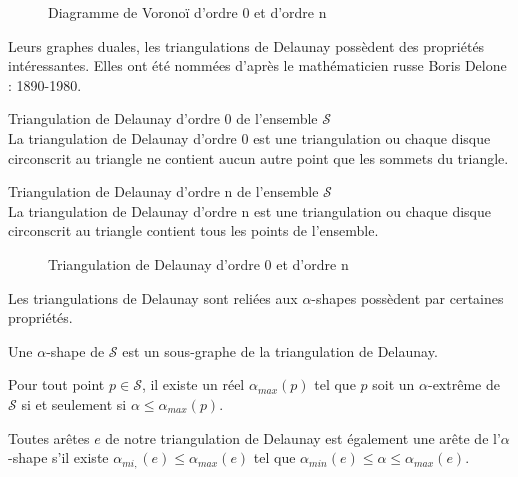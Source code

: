 \begin{figure}[H]
  \centering
  \caption{Diagramme de Voronoï d'ordre 0 et d'ordre n}
\end{figure}

Leurs graphes duales, les triangulations de Delaunay possèdent des propriétés intéressantes.  Elles ont été nommées d'après le mathématicien russe Boris Delone : 1890-1980.

\begin{Definition}{Triangulation de Delaunay d'ordre 0 de l'ensemble $\mathcal{S}$}\\
\label{def:tri-del-0}
  La triangulation de Delaunay d'ordre 0 est une triangulation ou chaque disque circonscrit au triangle ne contient aucun autre point que les sommets du triangle.
\end{Definition}

\begin{Definition}{Triangulation de Delaunay d'ordre n de l'ensemble $\mathcal{S}$}\\
\label{def:tri-del-n}
  La triangulation de Delaunay d'ordre n est une triangulation ou chaque disque circonscrit au triangle contient tous les points de l'ensemble.
\end{Definition}

\begin{figure}[H]
  \centering
  \caption{Triangulation de Delaunay d'ordre 0 et d'ordre n}
\end{figure}


Les triangulations de Delaunay sont reliées aux $\alpha$-shapes possèdent par certaines propriétés. \cite{EdeKirSei83}

\begin{Lemma}
  Une $\alpha$-shape de $\mathcal{S}$ est un sous-graphe de la triangulation de Delaunay.
\end{Lemma}

\begin{Lemma}
  Pour tout point $p \in \mathcal{S}$, il existe un réel $\alpha_{max}(p)$ tel que $p$ soit un $\alpha$-extrême de $\mathcal{S}$ si et seulement si $\alpha \leq \alpha_{max}(p)$.
\end{Lemma}

\begin{Lemma}
  Toutes arêtes $e$ de notre triangulation de Delaunay est également une arête de l'$\alpha$-shape s'il existe $\alpha_{mi,}(e) \leq \alpha_{max}(e)$ tel que $\alpha_{min}(e) \leq \alpha \leq \alpha_{max}(e)$.
\end{Lemma}
